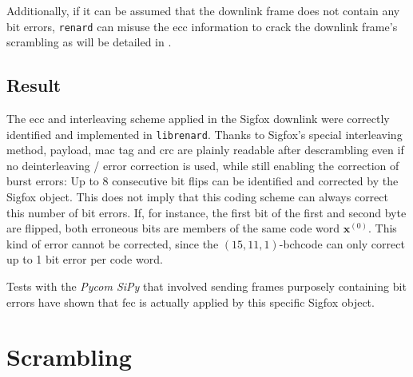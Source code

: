Additionally, if it can be assumed that the downlink frame does not contain any bit errors, \texttt{renard} can misuse the \gls{ecc} information to crack the downlink frame's scrambling as will be detailed in .

\subsection{Result}
The \gls{ecc} and interleaving scheme applied in the Sigfox downlink were correctly identified and implemented in \texttt{librenard}.
Thanks to Sigfox's special interleaving method, payload, \gls{mac} tag and \gls{crc} are plainly readable after descrambling even if no deinterleaving / error correction is used, while still enabling the correction of burst errors:
Up to 8 consecutive bit flips can be identified and corrected by the Sigfox object.
This does not imply that this coding scheme can always correct this number of bit errors.
If, for instance, the first bit of the first and second byte are flipped, both erroneous bits are members of the same code word $\mathbf x^{(0)}$.
This kind of error cannot be corrected, since the $(15, 11, 1)$-\gls{bchcode} can only correct up to 1 bit error per code word.

Tests with the \textit{Pycom SiPy} that involved sending frames purposely containing bit errors have shown that \gls{fec} is actually applied by this specific Sigfox object.

\FloatBarrier
\section{Scrambling}
\label{sec:downlink_scrambling}
